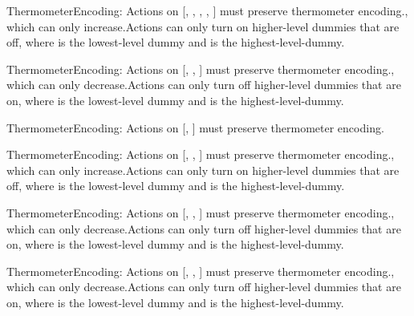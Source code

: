 \begin{constraints}
\item ThermometerEncoding: Actions on [, , , , ] must preserve thermometer encoding., which can only increase.Actions can only turn on higher-level dummies that are off, where  is the lowest-level dummy and  is the highest-level-dummy.
\item ThermometerEncoding: Actions on [, , ] must preserve thermometer encoding., which can only decrease.Actions can only turn off higher-level dummies that are on, where  is the lowest-level dummy and  is the highest-level-dummy.
\item ThermometerEncoding: Actions on [, ] must preserve thermometer encoding.
\item ThermometerEncoding: Actions on [, , ] must preserve thermometer encoding., which can only increase.Actions can only turn on higher-level dummies that are off, where  is the lowest-level dummy and  is the highest-level-dummy.
\item ThermometerEncoding: Actions on [, , ] must preserve thermometer encoding., which can only decrease.Actions can only turn off higher-level dummies that are on, where  is the lowest-level dummy and  is the highest-level-dummy.
\item ThermometerEncoding: Actions on [, , ] must preserve thermometer encoding., which can only decrease.Actions can only turn off higher-level dummies that are on, where  is the lowest-level dummy and  is the highest-level-dummy.

\end{constraints}
